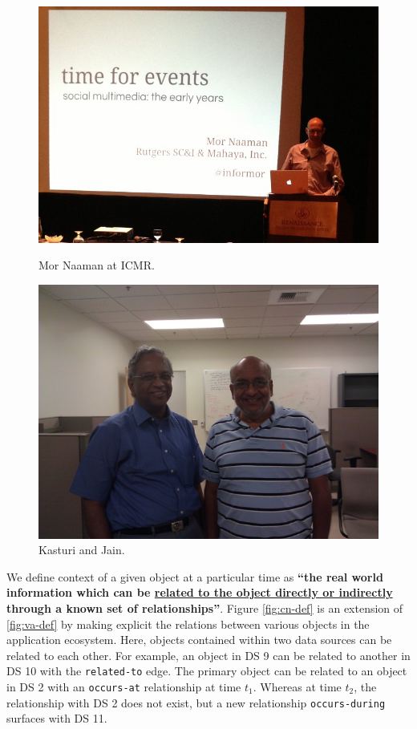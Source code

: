 \begin{figure}[t]
\begin{minipage}[b]{0.48\linewidth}
\centering
\includegraphics[width=\textwidth]{media/chapter2/naaman.jpg}
\caption{Mor Naaman at ICMR.}
\label{fig:naaman-icmr}
\end{minipage}
\hspace{0.5cm}
\begin{minipage}[b]{0.45\linewidth}
\centering
\includegraphics[width=\textwidth]{media/chapter1/kasturi-show.jpg}
\caption{Kasturi and Jain.}
\label{fig:example-kasturi-show}
\end{minipage}
\end{figure}

We define context of a given object at a particular time as \textbf{``the real world information which can be \uline{related to the object directly or indirectly} through a known set of relationships''}. Figure \ref{fig:cn-def} is an extension of \ref{fig:va-def} by making explicit the relations between various objects in the application ecosystem. Here, objects contained within two data sources can be related to each other. For example, an object in DS 9 can be related to another in DS 10 with the \texttt{related-to} edge. The primary object can be related to an object in DS 2 with an \texttt{occurs-at} relationship at time $t_1$. Whereas at time $t_2$, the relationship with DS 2 does not exist, but a new relationship \texttt{occurs-during} surfaces with DS 11.

